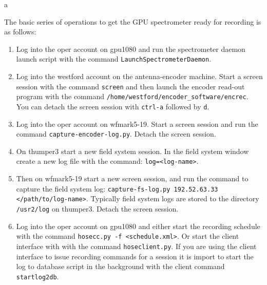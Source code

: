 a\documentclass[a4paper,14pt]{article}
\begin{document}
The basic series of operations to get the GPU spectrometer ready for recording is as follows:
\begin{enumerate}
 \item Log into the oper account on gpu1080 and run the spectrometer daemon launch script with the command \verb|LaunchSpectrometerDaemon|.
 \item Log into the westford account on the antenna-encoder machine. Start a screen session with the command \verb|screen| and then launch the
 encoder read-out program with the command \verb|/home/westford/encoder_software/encrec|. You can detach the screen session with \verb|ctrl-a| followed by \verb|d|.
 \item Log into the oper account on wfmark5-19. Start a screen session and run the command \verb|capture-encoder-log.py|. Detach the screen session.
 \item On thumper3 start a new field system session. In the field system window create a new log file with the command: \verb|log=<log-name>|.
 \item Then on wfmark5-19 start a new screen session, and run the command to capture the field system log: \verb|capture-fs-log.py 192.52.63.33 </path/to/log-name>|. Typically field system
 logs are stored to the directory \verb|/usr2/log| on thumper3. Detach the screen session.
 \item Log into the oper account on gpu1080 and either start the recording schedule with the command \verb|hosecc.py -f <schedule.xml>|. Or start the client
 interface with with the command \verb|hoseclient.py|. If you are using the client interface to issue recording commands for a session it is import to start
 the log to database script in the background with the client command \verb|startlog2db|. 
\end{enumerate}
\end{document}
